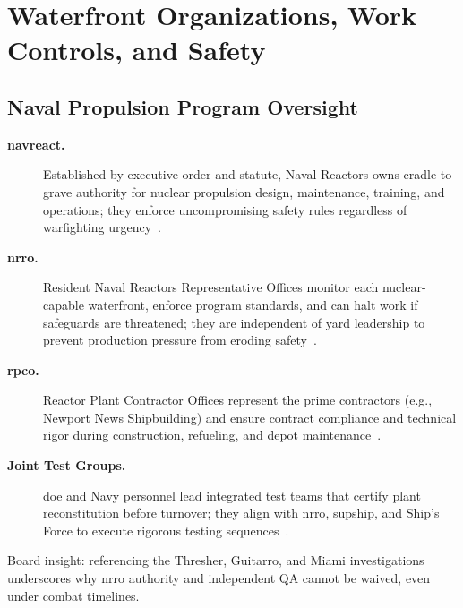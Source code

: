 \documentclass[../main.tex]{subfiles}
\begin{document}
\section{Waterfront Organizations, Work Controls, and Safety}

\subsection{Naval Propulsion Program Oversight}
\begin{description}
  \item[\textbf{\ac{navreact}.}] Established by executive order and statute, Naval Reactors owns cradle-to-grave authority for nuclear propulsion design, maintenance, training, and operations; they enforce uncompromising safety rules regardless of warfighting urgency~\autocite{edo-4-1-5-waterfront-work-control-2025}.
  \item[\textbf{\ac{nrro}.}] Resident Naval Reactors Representative Offices monitor each nuclear-capable waterfront, enforce program standards, and can halt work if safeguards are threatened; they are independent of yard leadership to prevent production pressure from eroding safety~\autocite{edo-4-1-5-waterfront-work-control-2025}.
  \item[\textbf{\ac{rpco}.}] Reactor Plant Contractor Offices represent the prime contractors (e.g., Newport News Shipbuilding) and ensure contract compliance and technical rigor during construction, refueling, and depot maintenance~\autocite{edo-4-1-5-waterfront-work-control-2025}.
  \item[\textbf{Joint Test Groups.}] \ac{doe} and Navy personnel lead integrated test teams that certify plant reconstitution before turnover; they align with \ac{nrro}, \ac{supship}, and Ship's Force to execute rigorous testing sequences~\autocite{edo-4-1-5-waterfront-work-control-2025}.
\end{description}
Board insight: referencing the Thresher, Guitarro, and Miami investigations underscores why \ac{nrro} authority and independent QA cannot be waived, even under combat timelines.
\end{document}
